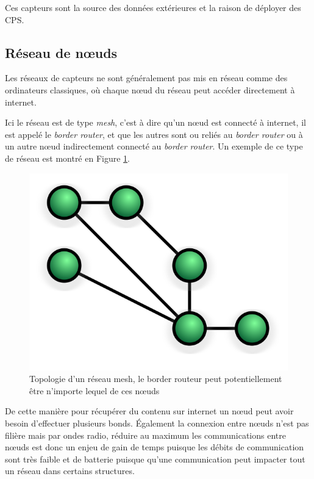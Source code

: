 Ces capteurs sont la source des données extérieures et la raison de déployer des CPS.

\subsection{Réseau de nœuds}

Les réseaux de capteurs ne sont généralement pas mis en réseau comme des ordinateurs classiques, où chaque nœud du réseau peut accéder directement à internet.

Ici le réseau est de type \emph{mesh}, c'est à dire qu'un nœud est connecté à internet, il est appelé le \emph{border router}, et que les autres sont ou reliés au \emph{border router} ou à un autre nœud indirectement connecté au \emph{border router}. Un exemple de ce type de réseau est montré en Figure \ref{mesh-network}.

\begin{figure}[ht!]
\centering
\label{mesh-network}
\includegraphics[scale=0.3]{images/mesh-network.png}
\caption{Topologie d'un réseau mesh, le border routeur peut potentiellement être n'importe lequel de ces nœuds}
\end{figure}

De cette manière pour récupérer du contenu sur internet un nœud peut avoir besoin d'effectuer plusieurs bonds. Également la connexion entre nœuds n'est pas filière mais par ondes radio, réduire au maximum les communications entre nœuds est donc un enjeu de gain de temps puisque les débits de communication sont très faible et de batterie puisque qu'une communication peut impacter tout un réseau dans certains structures.

